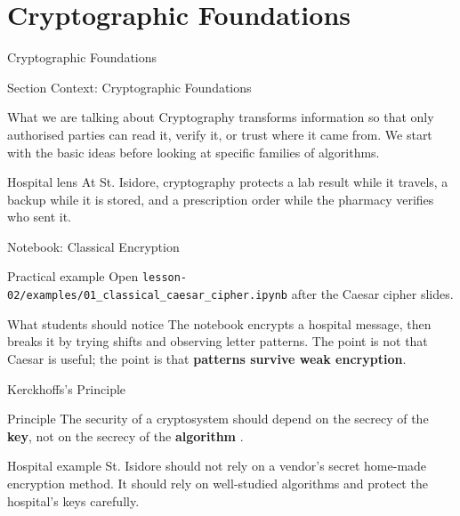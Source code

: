 \documentclass[presentation]{beamer}
\newcommand{\sectiontitleframe}[1]{
\begin{frame}[plain,c]
\begin{center}
{\usebeamerfont{title}\usebeamercolor[fg]{title}#1}
\end{center}
\end{frame}
}
\begin{document}
\section{Cryptographic Foundations}
\sectiontitleframe{Cryptographic Foundations}

\begin{frame}[c]{Section Context: Cryptographic Foundations}
\begin{block}{What we are talking about}
Cryptography transforms information so that only authorised parties can read it, verify it, or
trust where it came from. We start with the basic ideas before looking at specific families of
algorithms.
\end{block}

\begin{exampleblock}{Hospital lens}
At St. Isidore, cryptography protects a lab result while it travels, a backup while it is stored,
and a prescription order while the pharmacy verifies who sent it.
\end{exampleblock}
\end{frame}

\begin{frame}[c]{Notebook: Classical Encryption}
\begin{block}{Practical example}
Open \texttt{lesson-02/examples/01\_classical\_caesar\_cipher.ipynb} after the Caesar cipher slides.
\end{block}

\begin{exampleblock}{What students should notice}
The notebook encrypts a hospital message, then breaks it by trying shifts and observing letter
patterns. The point is not that Caesar is useful; the point is that \textbf{patterns survive weak
encryption}.
\end{exampleblock}
\end{frame}

\begin{frame}[c]{Kerckhoffs's Principle}
\begin{block}{Principle}
The security of a cryptosystem should depend on the secrecy of the \textbf{key}, not on the secrecy
of the \textbf{algorithm} \cite{kerckhoffs_1883}.
\end{block}

\begin{exampleblock}{Hospital example}
St. Isidore should not rely on a vendor's secret home-made encryption method. It should rely on
well-studied algorithms and protect the hospital's keys carefully.
\end{exampleblock}
\end{frame}
\end{document}

